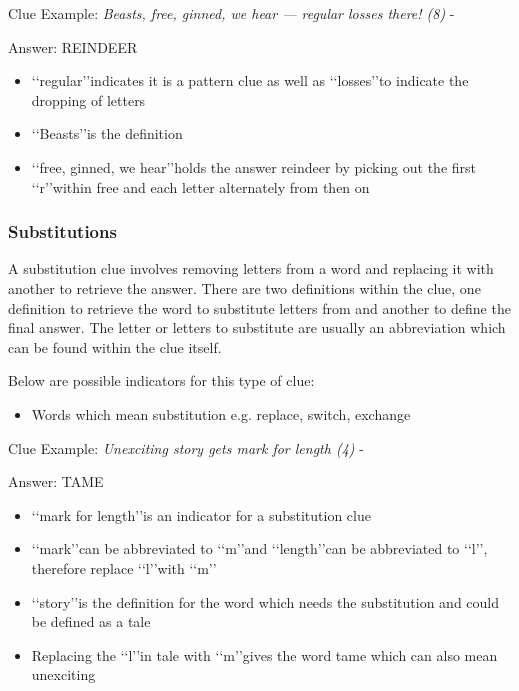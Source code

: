 Clue Example: \emph{Beasts, free, ginned, we hear — regular losses there! (8)} - \citep{shuchiPicking09}

Answer: REINDEER 

\begin{itemize}
	\item \lq\lq regular\rq\rq indicates it is a pattern clue as well as \lq\lq losses\rq\rq to indicate the dropping of letters 
	\item \lq\lq Beasts\rq\rq is the definition 
	\item \lq\lq free, ginned, we hear\rq\rq holds the answer reindeer by picking out the first \lq\lq r\rq\rq within free and each letter alternately from then on
\end{itemize} 

\subsubsection{Substitutions}

A substitution clue involves removing letters from a word and replacing it with another to retrieve the answer. There are two definitions within the clue, one definition to retrieve the word to substitute letters from and another to define the final answer. The letter or letters to substitute are usually an abbreviation which can be found within the clue itself. 

Below are possible indicators for this type of clue:
\begin{itemize} 
	\item Words which mean substitution e.g. replace, switch, exchange
\\
\end{itemize}

Clue Example: \emph{Unexciting story gets mark for length (4)} - \citep{shuchiSubstitutions08}

Answer: TAME 

\begin{itemize}
	\item \lq\lq mark for length\rq\rq is an indicator for a substitution clue  
	\item \lq\lq mark\rq\rq can be abbreviated to \lq\lq m\rq\rq and \lq\lq length\rq\rq can be abbreviated to \lq\lq l\rq\rq, therefore replace \lq\lq l\rq\rq with \lq\lq m\rq\rq 
	\item \lq\lq story\rq\rq is the definition for the word which needs the substitution and could be defined as a tale 
	\item Replacing the \lq\lq l\rq\rq in tale with \lq\lq m\rq\rq gives the word tame which can also mean unexciting 
\end{itemize}

